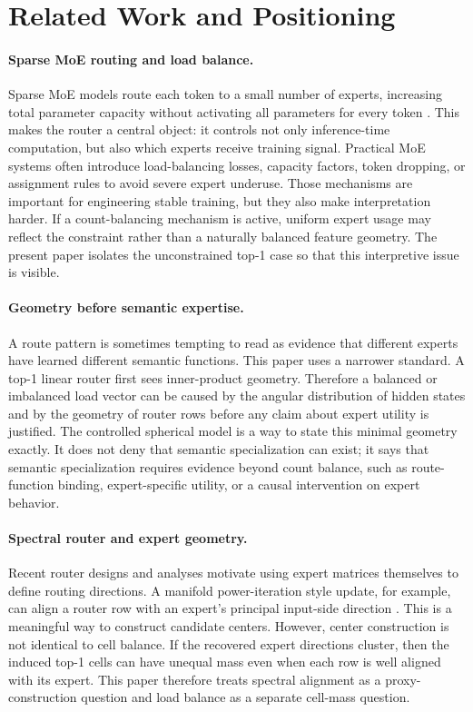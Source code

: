 \section{Related Work and Positioning}

\paragraph{Sparse MoE routing and load balance.}
Sparse MoE models route each token to a small number of experts, increasing
total parameter capacity without activating all parameters for every token
\citep{shazeer2017outrageously,fedus2022switch}. This makes the router a
central object: it controls not only inference-time computation, but also which
experts receive training signal. Practical MoE systems often introduce
load-balancing losses, capacity factors, token dropping, or assignment rules to
avoid severe expert underuse. Those mechanisms are important for engineering
stable training, but they also make interpretation harder. If a count-balancing
mechanism is active, uniform expert usage may reflect the constraint rather
than a naturally balanced feature geometry. The present paper isolates the
unconstrained top-1 case so that this interpretive issue is visible.

\paragraph{Geometry before semantic expertise.}
A route pattern is sometimes tempting to read as evidence that different
experts have learned different semantic functions. This paper uses a narrower
standard. A top-1 linear router first sees inner-product geometry. Therefore a
balanced or imbalanced load vector can be caused by the angular distribution of
hidden states and by the geometry of router rows before any claim about expert
utility is justified. The controlled spherical model is a way to state this
minimal geometry exactly. It does not deny that semantic specialization can
exist; it says that semantic specialization requires evidence beyond count
balance, such as route-function binding, expert-specific utility, or a causal
intervention on expert behavior.

\paragraph{Spectral router and expert geometry.}
Recent router designs and analyses motivate using expert matrices themselves
to define routing directions. A manifold power-iteration style update, for
example, can align a router row with an expert's principal input-side direction
\citep{routermpi2026}. This is a meaningful way to construct candidate centers.
However, center construction is not identical to cell balance. If the recovered
expert directions cluster, then the induced top-1 cells can have unequal mass
even when each row is well aligned with its expert. This paper therefore treats
spectral alignment as a proxy-construction question and load balance as a
separate cell-mass question.

